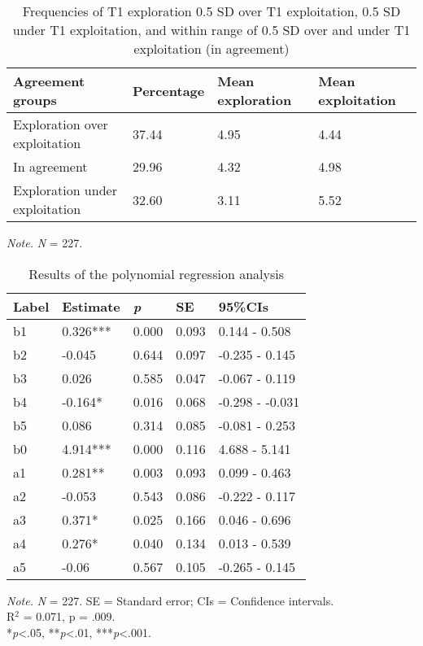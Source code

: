 \documentclass[man]{apa7}
\begin{document}
\begin{table}[htb]
\caption{Frequencies of T1 exploration 0.5 SD over T1 exploitation, 0.5 SD under T1 exploitation, and within range of 0.5 SD over and under T1 exploitation (in agreement)}
\begin{tabular}{p{6.0cm}lll}
\toprule
Agreement groups & Percentage & Mean exploration & Mean exploitation \\
\midrule
Exploration over exploitation & 37.44 & 4.95 & 4.44\\
In agreement & 29.96 & 4.32 & 4.98\\
Exploration under exploitation & 32.60 & 3.11 & 5.52\\
\bottomrule
\end{tabular}
\smallskip
\begin{tablenotes}
{\small
\textit{Note.} \textit{N} = 227. 
}
\end{tablenotes}
\end{table}


\begin{table}[ht]
\caption{Results of the polynomial regression analysis}
\begin{tabular}{p{1.5cm}p{2.0cm}p{1.5cm}p{1.5cm}p{2.5cm}}
\toprule
Label & Estimate & \textit{p} & SE & 95\%CIs \\ 
\midrule
b1 & 0.326*** & 0.000 & 0.093 & 0.144 - 0.508 \\ 
  b2 & -0.045  & 0.644 & 0.097 & -0.235 - 0.145 \\ 
  b3 & 0.026  & 0.585 & 0.047 & -0.067 - 0.119 \\ 
  b4 & -0.164* & 0.016 & 0.068 & -0.298 - -0.031 \\ 
  b5 & 0.086  & 0.314 & 0.085 & -0.081 - 0.253 \\ 
  b0 & 4.914*** & 0.000 & 0.116 & 4.688 - 5.141 \\ 
  a1 & 0.281** & 0.003 & 0.093 & 0.099 - 0.463 \\ 
  a2 & -0.053  & 0.543 & 0.086 & -0.222 - 0.117 \\ 
  a3 & 0.371* & 0.025 & 0.166 & 0.046 - 0.696 \\ 
  a4 & 0.276* & 0.040 & 0.134 & 0.013 - 0.539 \\ 
  a5 & -0.06  & 0.567 & 0.105 & -0.265 - 0.145 \\ 
\bottomrule
\end{tabular}
\smallskip
\begin{tablenotes}
{\small
\textit{Note.} \textit{N} = 227. SE = Standard error; CIs = Confidence intervals. \\ R$^2$ = 0.071, p = .009. \\ *\textit{p}<.05, **\textit{p}<.01, ***\textit{p}<.001.  
}
\end{tablenotes}
\end{table}
\end{document}
